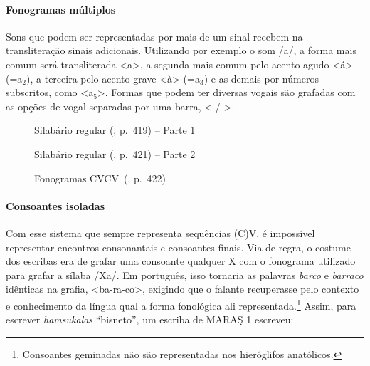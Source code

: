 \paragraph{Fonogramas múltiplos}
Sons que podem ser representadas por mais de um sinal recebem na transliteração
sinais adicionais. Utilizando por exemplo o som /a/, a forma mais comum será
transliterada <a>, a segunda mais comum pelo acento agudo <á> (=a$_2$), a terceira
pelo acento grave <à> (=a$_3$) e as demais por números subscritos, como <a$_5$>.
Formas que podem ter diversas vogais são grafadas com as opções de vogal
separadas por uma barra, < \slash{} >.
\vfill

\clearpage
{
	\begin{figure}[ht]
		\caption[Silabário regular -- Parte 1]{Silabário regular
			(, p.\ 419)
			-- Parte 1}\label{tab:silabariobasico}
	\end{figure}
}
\clearpage

\clearpage
{
	\begin{figure}[ht]
		\caption[Silabário regular -- Parte 2]{Silabário
			regular (, p.\ 421)
			-- Parte 2}\label{tab:silabariobasicob}
	\end{figure}
	\begin{figure}[ht]
		\caption[Fonogramas CVCV]{Fonogramas CVCV~(, p.\ 422)}\label{tab:CVCV}
	\end{figure}
}
\clearpage


\paragraph{Consoantes isoladas}
Com esse sistema que sempre representa sequências {(C)}V, é impossível
representar encontros consonantais e consoantes finais.
Via de regra, o costume dos escribas era de grafar uma consoante qualquer X com
o fonograma utilizado para grafar a sílaba /Xa/.
Em português, isso tornaria as palavras \emph{barco} e \emph{barraco} idênticas
na grafia, <ba-ra-co>, exigindo que o falante recuperasse pelo contexto e
conhecimento da língua qual a forma fonológica ali
representada.\footnote{Consoantes geminadas não são representadas nos
	hieróglifos anatólicos.}
Assim, para escrever \emph{hamsukalas} ``bisneto'', um escriba de MARAŞ 1 escreveu:


